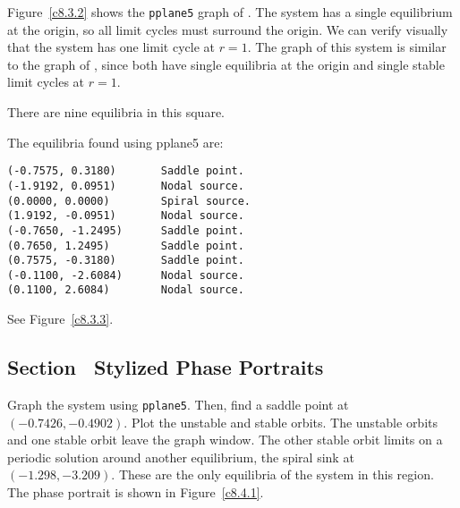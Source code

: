 Figure~\ref{c8.3.2} shows the {\tt pplane5} graph of .
The system has a single equilibrium at the origin, so all limit cycles
must surround the origin.  We can verify visually that the system has
one limit cycle at $r = 1$.  The graph of this system is similar to
the graph of , since both
have single equilibria at the origin and single stable limit cycles at
$r = 1$.

\begin{figure}[htb]
                       \centerline{%
                       }
\end{figure}

\ans There are nine equilibria in this square.

\soln  The equilibria found using {\sf pplane5} are:
\begin{verbatim}
(-0.7575, 0.3180)       Saddle point.            
(-1.9192, 0.0951)       Nodal source.            
(0.0000, 0.0000)        Spiral source.           
(1.9192, -0.0951)       Nodal source.            
(-0.7650, -1.2495)      Saddle point.            
(0.7650, 1.2495)        Saddle point.            
(0.7575, -0.3180)       Saddle point.            
(-0.1100, -2.6084)      Nodal source.            
(0.1100, 2.6084)        Nodal source.            
\end{verbatim}
See Figure~\ref{c8.3.3}.

\begin{figure}[htb]
                       \centerline{%
                       }
\end{figure}


\subsection*{Section~\protect{\ref{S:SPP}} Stylized Phase Portraits}

Graph the system using {\tt pplane5}.  Then, find a saddle point at
$(-0.7426,-0.4902)$.  Plot the unstable and stable orbits.  The unstable
orbits and one stable orbit leave the graph window.  The other stable
orbit limits on a periodic solution around another equilibrium, the
spiral sink at $(-1.298,-3.209)$.  These are the only equilibria of
the system in this region.  The phase portrait is shown in
Figure~\ref{c8.4.1}.

